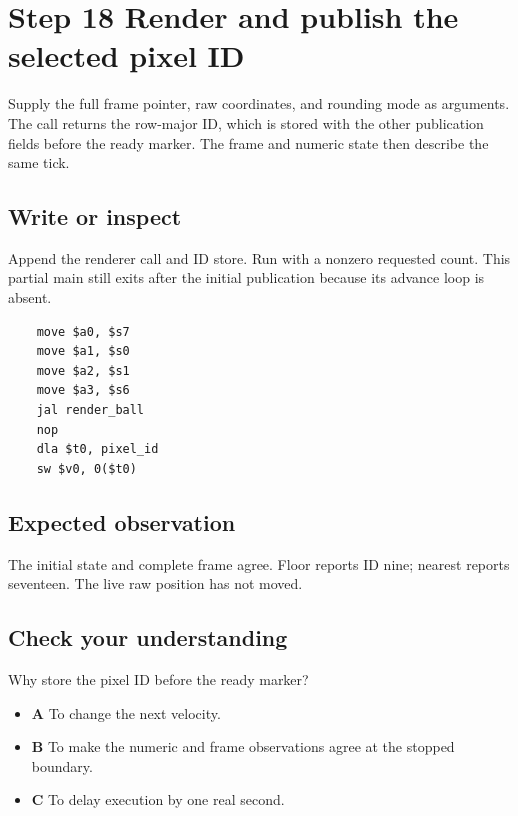 \section{Step 18 Render and publish the selected pixel ID}\label{ball-s18}

Supply the full frame pointer, raw coordinates, and rounding mode as arguments. The call returns the row-major ID, which is stored with the other publication fields before the ready marker. The frame and numeric state then describe the same tick.

\subsection{Write or inspect}
Append the renderer call and ID store. Run with a nonzero requested count. This partial main still exits after the initial publication because its advance loop is absent.

\begin{verbatim}
    move $a0, $s7
    move $a1, $s0
    move $a2, $s1
    move $a3, $s6
    jal render_ball
    nop
    dla $t0, pixel_id
    sw $v0, 0($t0)
\end{verbatim}

\subsection{Expected observation}
The initial state and complete frame agree. Floor reports ID nine; nearest reports seventeen. The live raw position has not moved.

\subsection{Check your understanding}
Why store the pixel ID before the ready marker?

\begin{itemize}
  \item \textbf{A} To change the next velocity.
  \item \textbf{B} To make the numeric and frame observations agree at the stopped boundary.
  \item \textbf{C} To delay execution by one real second.
\end{itemize}
